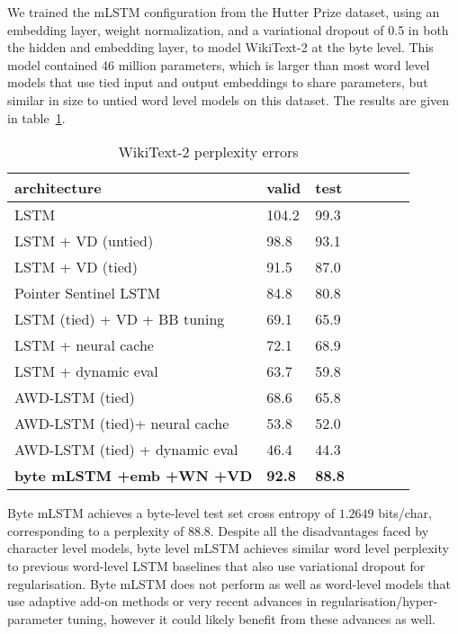 \documentclass{article}
\begin{document}
We trained the mLSTM configuration from the Hutter Prize dataset, using an embedding layer, weight normalization, and a variational dropout of 0.5 in both the hidden and embedding layer, to model WikiText-2 at the byte level. This model contained 46 million parameters, which is larger than most word level models that use tied input and output embeddings \citep{press2017,inan2017} to share parameters, but similar in size to untied word level models on this dataset. The results are given in table~\ref{tab:wikitext}.
\begin{table}[h]
\begin{center} 
\begin{tabular}{  l  l  l  l  l  l  l } \toprule 
architecture &  valid & test  \\ 
\midrule 
LSTM   \citep{grave2017} & 104.2 & 99.3 \\
LSTM + VD (untied)\citep{inan2017} & 98.8 & 93.1 \\
LSTM + VD (tied)\citep{inan2017} & 91.5 & 87.0 \\
Pointer Sentinel LSTM \citep{Merity2016} & 84.8 & 80.8 \\
LSTM (tied) + VD + BB tuning \citep{melis2017} & 69.1 & 65.9 \\
LSTM + neural cache \citep{grave2017} & 72.1 & 68.9 \\
LSTM + dynamic eval \citep{krause2017} &  63.7 & 59.8\\
AWD-LSTM (tied) \citep{merity2017} & 68.6 & 65.8 \\
AWD-LSTM (tied)+ neural cache \citep{merity2017} & 53.8 & 52.0 \\
AWD-LSTM (tied) + dynamic eval \citep{krause2017} & 46.4 & 44.3 \\
\midrule 
\textbf{byte mLSTM +emb +WN +VD} & \textbf{92.8} & \textbf{88.8} \\
\bottomrule
\end{tabular} 
\end{center}
\caption{WikiText-2 perplexity errors}
\label{tab:wikitext}
\end{table}

Byte mLSTM achieves a byte-level test set cross entropy of $1.2649$ bits/char, corresponding to a perplexity of $88.8$. Despite all the disadvantages faced by character level models, byte level mLSTM achieves similar word level perplexity to previous word-level LSTM baselines that also use variational dropout for regularisation. Byte mLSTM does not perform as well as word-level models that use adaptive add-on methods or very recent advances in regularisation/hyper-parameter tuning, however it could likely benefit from these advances as well. 
\end{document}
